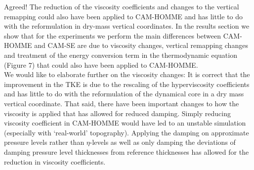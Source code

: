 \documentclass[11pt]{article}
\begin{document}
Agreed! The reduction of the viscosity coefficients and changes to the vertical remapping could also have been applied to CAM-HOMME and has little to do with the reformulation in dry-mass vertical coordinates. In the results section we show that for the experiments we perform the main differences between CAM-HOMME and CAM-SE are due to viscosity changes, vertical remapping changes and treatment of the energy conversion term in the thermodynamic equation (Figure 7) that could also have been applied to CAM-HOMME.\\

We would like to elaborate further on the viscosity changes: It is correct that the improvement in the TKE is due to the rescaling of the hyperviscosity coefficients and has little to do with the reformulation of the dynamical core in a dry mass vertical coordinate. That said, there have been important changes to how the viscosity is applied that has allowed for reduced damping. Simply reducing viscosity coefficient in CAM-HOMME would have led to an unstable simulation (especially with `real-world' topography). Applying the damping on approximate pressure levels rather than $\eta$-levels as well as only damping the deviations of damping pressure level thicknesses from reference thicknesses has allowed for the reduction in viscosity coefficients.\\
\end{document}
